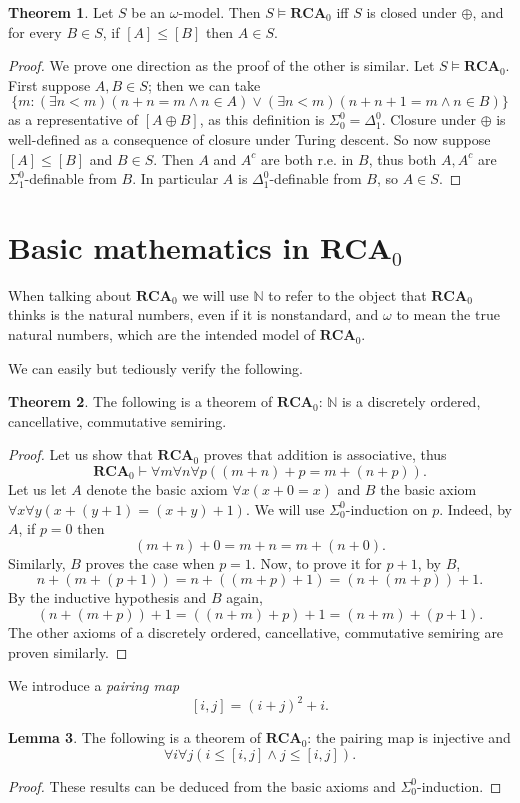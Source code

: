 \documentclass[12pt]{book}
\newcommand{\NN}{\mathbb{N}}
\newcommand{\RCA}{\mathbf{RCA}}
\newcommand{\dfn}[1]{\emph{#1}\index{#1}}
\theoremstyle{definition}
\newtheorem{theorem}{Theorem}[chapter]
\newtheorem{lemma}[theorem]{Lemma}
\begin{document}
\begin{theorem}
Let $S$ be an $\omega$-model. Then $S \models \RCA_0$ iff $S$ is closed under $\oplus$, and for every $B \in S$, if $[A] \leq [B]$ then $A \in S$.
\end{theorem}
\begin{proof}
We prove one direction as the proof of the other is similar.
Let $S \models \RCA_0$. First suppose $A, B \in S$; then we can take
$$\{m: (\exists n < m)(n + n = m \wedge n \in A) \vee (\exists n < m)(n + n + 1 = m \wedge n \in B)\}$$
as a representative of $[A \oplus B]$, as this definition is $\Sigma_0^0 = \Delta_1^0$.
Closure under $\oplus$ is well-defined as a consequence of closure under Turing descent.
So now suppose $[A] \leq [B]$ and $B \in S$.
Then $A$ and $A^c$ are both r.e. in $B$, thus both $A,A^c$ are $\Sigma_1^0$-definable from $B$.
In particular $A$ is $\Delta_1^0$-definable from $B$, so $A \in S$.
\end{proof}

\section{Basic mathematics in $\RCA_0$}
When talking about $\RCA_0$ we will use $\NN$ to refer to the object that $\RCA_0$ thinks is the natural numbers, even if it is nonstandard, and $\omega$ to mean the true natural numbers, which are the intended model of $\RCA_0$.

We can easily but tediously verify the following.
\begin{theorem}
The following is a theorem of $\RCA_0$: $\NN$ is a discretely ordered, cancellative, commutative semiring.
\end{theorem}
\begin{proof}
Let us show that $\RCA_0$ proves that addition is associative, thus
$$\RCA_0 \vdash \forall m\forall n\forall p((m+n)+p = m+(n+p)).$$
Let us let $A$ denote the basic axiom $\forall x(x + 0 = x)$ and $B$ the basic axiom $\forall x \forall y(x+(y+1) = (x+y) + 1)$.
We will use $\Sigma_0^0$-induction on $p$.
Indeed, by $A$, if $p = 0$ then
$$(m+n)+0=m+n=m+(n+0).$$
Similarly, $B$ proves the case when $p = 1$.
Now, to prove it for $p + 1$, by $B$,
$$n+(m+(p+1)) = n+((m+p)+1) = (n+(m+p))+1.$$
By the inductive hypothesis and $B$ again,
$$(n+(m+p))+1 = ((n+m)+p)+1 = (n+m)+(p+1).$$
The other axioms of a discretely ordered, cancellative, commutative semiring are proven similarly.
\end{proof}

We introduce a \dfn{pairing map}
$$[i, j] = (i+j)^2 + i.$$
\begin{lemma}
The following is a theorem of $\RCA_0$: the pairing map is injective and
$$\forall i \forall j(i \leq [i,j] \wedge j \leq [i,j]).$$
\end{lemma}
\begin{proof}
These results can be deduced from the basic axioms and $\Sigma_0^0$-induction.
\end{proof}
\end{document}
